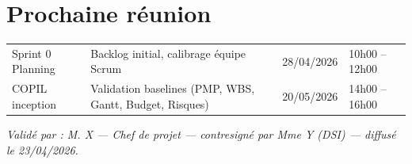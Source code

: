 \documentclass[11pt,a4paper,oneside]{report}
\begin{document}
\section*{Prochaine réunion}

\renewcommand{\arraystretch}{1.3}
\begin{tabularx}{\textwidth}{L{3cm} Y L{2.5cm} Y}
\toprule
{}    &                                  &       &  \\
\midrule
Sprint 0 Planning & Backlog initial, calibrage équipe Scrum    & 28/04/2026     & 10h00 -- 12h00 \\
COPIL inception   & Validation baselines (PMP, WBS, Gantt, Budget, Risques) & 20/05/2026 & 14h00 -- 16h00 \\
\bottomrule
\end{tabularx}

\vspace{8pt}
\begin{center}
{\footnotesize\textit{Validé par : M. X --- Chef de projet --- contresigné par Mme Y (DSI) --- diffusé le 23/04/2026.}}
\end{center}
\end{document}
